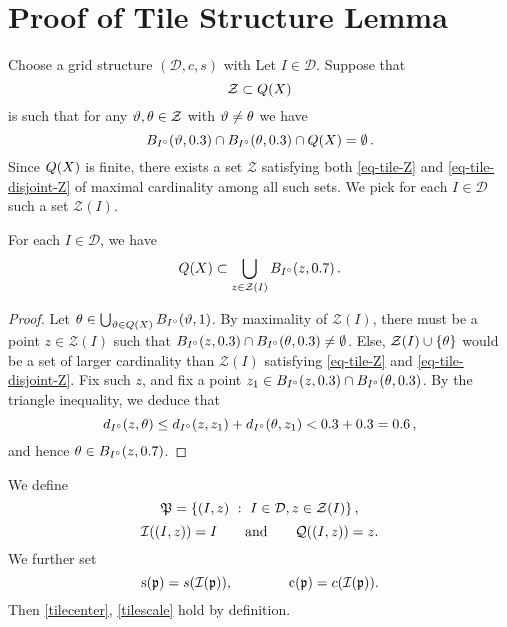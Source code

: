 \section{Proof of Tile Structure Lemma}
\label{subsectiles}
Choose a grid structure $(\mathcal{D}, c, s)$ with 
Let $I \in \mathcal{D}$. Suppose that
\begin{equation}
    \label{eq-tile-Z}
    \mathcal{Z} \subset {Q}(X)
\end{equation}
is such that for any ${\vartheta}, {\theta} \in \mathcal{Z}$ with ${\vartheta}\ne {\theta}$ we have
\begin{equation}
    \label{eq-tile-disjoint-Z}
    B_{I^\circ}({\vartheta}, 0.3) \cap B_{I^\circ}({\theta}, 0.3) \cap {Q}(X) = \emptyset\,.
\end{equation}
Since ${Q}(X)$ is finite, there exists a set $\mathcal{Z}$ satisfying both \eqref{eq-tile-Z} and \eqref{eq-tile-disjoint-Z} of maximal cardinality among all such sets. We pick for each $I \in \mathcal{D}$ such a set $\mathcal{Z}(I)$.

\begin{lemma}
    \label{frequency-ball-cover}
    \leanok
    For each $I \in \mathcal{D}$, we have
    \begin{equation}
        \label{eq-tile-cover}
        {Q}(X) \subset \bigcup_{z \in \mathcal{Z}(I)} B_{I^\circ}(z, 0.7)\,.
    \end{equation}
\end{lemma}

\begin{proof}
    \leanok
    Let ${\theta} \in \bigcup_{{\vartheta} \in {Q}(X)} B_{I^\circ}({\vartheta}, 1)$. By maximality of $\mathcal{Z}(I)$, there must be a point $z \in \mathcal{Z}(I)$ such that $B_{I^\circ}(z, 0.3) \cap B_{I^\circ}({\theta}, 0.3) \ne \emptyset$. Else, $\mathcal{Z}(I) \cup \{{\theta}\}$ would be a set of larger cardinality than $\mathcal{Z}(I)$ satisfying \eqref{eq-tile-Z} and \eqref{eq-tile-disjoint-Z}. Fix such $z$, and fix a point $z_1 \in B_{I^\circ}(z, 0.3) \cap B_{I^\circ}({\theta}, 0.3)$. By the triangle inequality, we deduce that
    $$
        d_{I^\circ}(z,{\theta}) \le d_{I^\circ}(z,z_1) + d_{I^\circ}({\theta}, z_1) < 0.3 + 0.3 = 0.6\,,
    $$
    and hence ${\theta} \in B_{I^\circ}(z, 0.7)$.
\end{proof}

We define
$$
    {\mathfrak P} = \{(I, z) \ : \ I \in \mathcal{D}, z \in \mathcal{Z}(I)\}\,,
$$
$${\mathcal{I}}((I, z)) = I\qquad \text{and} \qquad {\mathcal{Q}}((I, z)) = z.$$ We further set $${\mathrm{s}}({\mathfrak p}) = s({\mathcal{I}}({\mathfrak p})),\qquad \qquad {\mathrm{c}}({\mathfrak p}) = c({\mathcal{I}}({\mathfrak p})).$$ Then \eqref{tilecenter}, \eqref{tilescale} hold by definition.

